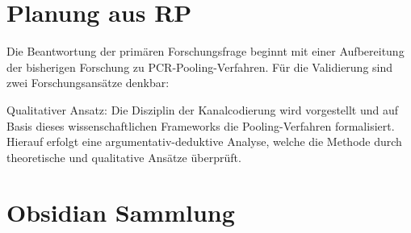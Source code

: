


\section{Planung aus RP}
Die Beantwortung der primären Forschungsfrage beginnt mit einer Aufbereitung der bisherigen Forschung zu PCR-Pooling-Verfahren.
Für die Validierung sind zwei Forschungsansätze denkbar:

Qualitativer Ansatz:
Die Disziplin der Kanalcodierung wird vorgestellt und auf Basis dieses wissenschaftlichen Frameworks die Pooling-Verfahren formalisiert.
Hierauf erfolgt eine argumentativ-deduktive Analyse, welche die Methode durch theoretische und qualitative Ansätze überprüft.


\section{Obsidian Sammlung}

